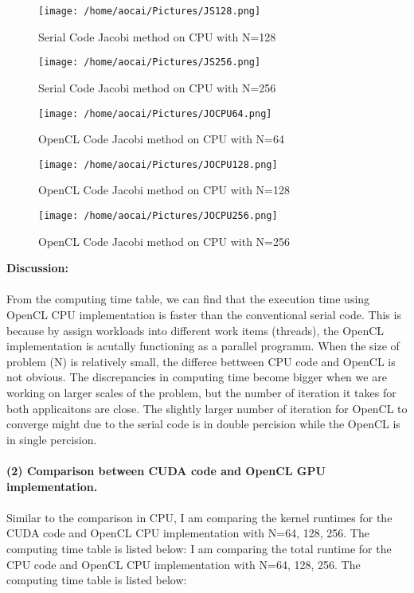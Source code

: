 \documentclass[12pt]{article}
\begin{document}
\begin{figure}[H]
	\centering
	\texttt{[image: /home/aocai/Pictures/JS128.png]}
	\caption[Optional caption]{Serial Code Jacobi method on CPU with N=128}
	\label{fig:JS128}
\end{figure}
\begin{figure}[H]
	\centering
	\texttt{[image: /home/aocai/Pictures/JS256.png]}
	\caption[Optional caption]{Serial Code Jacobi method on CPU with N=256}
	\label{fig:JS256}
\end{figure}
\begin{figure}[H]
	\centering
	\texttt{[image: /home/aocai/Pictures/JOCPU64.png]}
	\caption[Optional caption]{OpenCL Code Jacobi method on CPU with N=64}
	\label{fig:JOCPU64}
\end{figure}
\begin{figure}[H]
	\centering
	\texttt{[image: /home/aocai/Pictures/JOCPU128.png]}
	\caption[Optional caption]{OpenCL Code Jacobi method on CPU with N=128}
	\label{fig:JOCPU128}
\end{figure}
\begin{figure}[H]
	\centering
	\texttt{[image: /home/aocai/Pictures/JOCPU256.png]}
	\caption[Optional caption]{OpenCL Code Jacobi method on CPU with N=256}
	\label{fig:JOCPU256}
\end{figure}
{\bfseries Discussion:}\\\\
From the computing time table, we can find that the execution time using OpenCL CPU implementation is faster than the conventional serial code. This is because by assign workloads into different work items (threads), the OpenCL implementation is acutally functioning as a parallel programm. When the size of problem (N) is relatively small, the differce bettween CPU code and OpenCL is not obvious. The discrepancies in computing time become bigger when we are working on larger scales of the problem, but the number of iteration it takes for both applicaitons are close. The slightly larger number of iteration for OpenCL to converge might due to the serial code is in double percision while the OpenCL is in single percision.\\\\

{\bfseries(2) Comparison between CUDA code and OpenCL GPU implementation.}\\\\
Similar to the comparison in CPU, I am comparing the kernel runtimes for the CUDA code and OpenCL CPU implementation with N=64, 128, 256. The computing time table is listed below:
I am comparing the total runtime for the CPU code and OpenCL CPU implementation with N=64, 128, 256. The computing time table is listed below:
\end{document}
